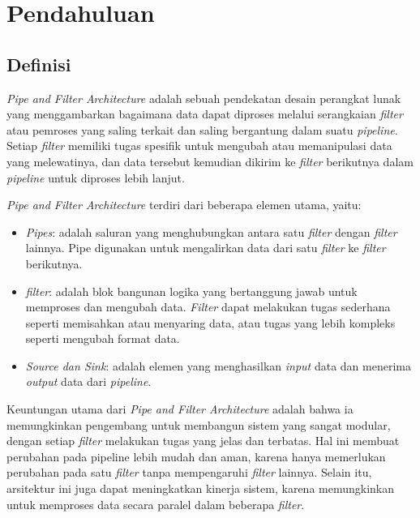\chapter{Pendahuluan}



	\section{Definisi}
		\textit{Pipe and Filter Architecture} adalah sebuah pendekatan desain perangkat lunak yang menggambarkan bagaimana data dapat diproses melalui serangkaian \textit{filter} atau pemroses yang saling terkait dan saling bergantung dalam suatu \textit{pipeline}. Setiap \textit{filter} memiliki tugas spesifik untuk mengubah atau memanipulasi data yang melewatinya, dan data tersebut kemudian dikirim ke \textit{filter} berikutnya dalam \textit{pipeline} untuk diproses lebih lanjut.
	
	\textit{Pipe and Filter Architecture} terdiri dari beberapa elemen utama, yaitu:
	\begin{itemize}
		\item \textit{Pipes}: adalah saluran yang menghubungkan antara satu \textit{filter} dengan \textit{filter} lainnya. Pipe digunakan untuk mengalirkan data dari satu \textit{filter} ke \textit{filter} berikutnya.
		\item \textit{filter}: adalah blok bangunan logika yang bertanggung jawab untuk memproses dan mengubah data. \textit{Filter} dapat melakukan tugas sederhana seperti memisahkan atau menyaring data, atau tugas yang lebih kompleks seperti mengubah format data.
		\item \textit{Source dan Sink}: adalah elemen yang menghasilkan \textit{input} data dan menerima \textit{output} data dari \textit{pipeline}.
	\end{itemize}
	
	Keuntungan utama dari \textit{Pipe and Filter Architecture} adalah bahwa ia memungkinkan pengembang untuk membangun sistem yang sangat modular, dengan setiap \textit{filter} melakukan tugas yang jelas dan terbatas. Hal ini membuat perubahan pada pipeline lebih mudah dan aman, karena hanya memerlukan perubahan pada satu \textit{filter} tanpa mempengaruhi \textit{filter} lainnya. Selain itu, arsitektur ini juga dapat meningkatkan kinerja sistem, karena memungkinkan untuk memproses data secara paralel dalam beberapa \textit{filter}.
	
